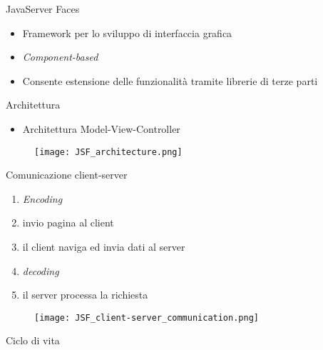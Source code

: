 \begin{frame}{JavaServer Faces}

\begin{itemize}
\item Framework per lo sviluppo di interfaccia grafica
\item \textsl{Component-based}
\item Consente estensione delle funzionalità tramite librerie di terze parti
\end{itemize}

\end{frame}


\begin{frame}{Architettura}

\begin{itemize}
\item Architettura Model-View-Controller
\end{itemize}

\begin{figure}
	\centering
	\texttt{[image: JSF\_architecture.png]}
\end{figure}

\end{frame}


\begin{frame}{Comunicazione client-server}

\begin{enumerate}
\item \textsl{Encoding}
\item invio pagina al client
\item il client naviga ed invia dati al server
\item \textsl{decoding}
\item il server processa la richiesta
\end{enumerate}

\begin{figure}
	\centering
	\texttt{[image: JSF\_client-server\_communication.png]}
\end{figure}

\end{frame}

\begin{frame}{Ciclo di vita}



\end{frame}






















